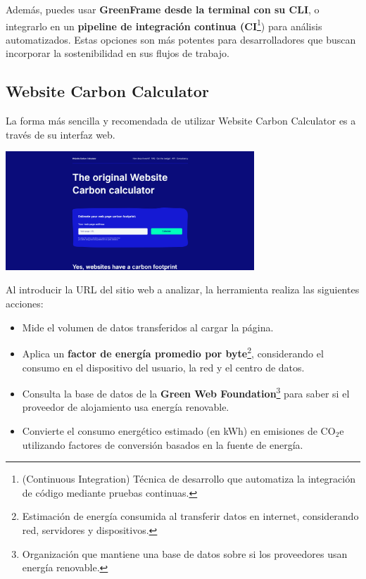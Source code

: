 \documentclass[12pt,a4paper]{report}
\begin{document}
Además, puedes usar \textbf{GreenFrame desde la terminal con su CLI}, o
integrarlo en un \textbf{pipeline de integración continua
  (CI}\footnote{(Continuous Integration) Técnica de desarrollo que automatiza la
  integración de código mediante pruebas continuas.}) para análisis
automatizados. Estas opciones son más potentes para desarrolladores que buscan
incorporar la sostenibilidad en sus flujos de trabajo.

\subsection{Website Carbon Calculator}
La forma más sencilla y recomendada de utilizar Website Carbon Calculator es a
través de su interfaz web.

\begin{center}
  \includegraphics[width=0.7\textwidth]{imagenes/WCC_1.png}
\end{center}

Al introducir la URL del sitio web a analizar, la herramienta realiza las
siguientes acciones:

\begin{itemize}
  \item Mide el volumen de datos transferidos al cargar la página.
  \item Aplica un \textbf{factor de energía promedio por byte}\footnote{Estimación de
          energía consumida al transferir datos en internet, considerando red, servidores
          y dispositivos.}, considerando el consumo en el dispositivo del usuario, la red
        y el centro de datos.
  \item Consulta la base de datos de la \textbf{Green Web
          Foundation}\footnote{Organización que mantiene una base de datos sobre si los
          proveedores usan energía renovable.} para saber si el proveedor de alojamiento
        usa energía renovable.
  \item Convierte el consumo energético estimado (en kWh) en emisiones de CO$_2$e
        utilizando factores de conversión basados en la fuente de energía.
\end{itemize}
\end{document}
